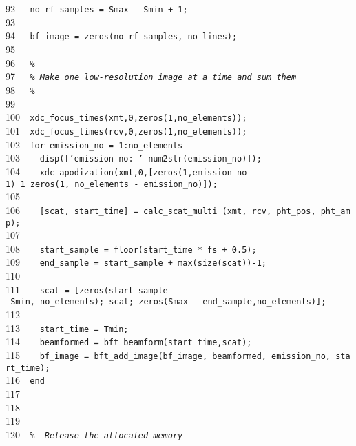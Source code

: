 \documentclass{manual}
\begin{document}
{92{\tt~~~}{\tt no\_rf\_samples~=~Smax~-~Smin~+~1;}\\
93{\tt~~~}{\tt }\\
94{\tt~~~}{\tt bf\_image~=~zeros(no\_rf\_samples,~no\_lines);}\\
95{\tt~~~}{\tt }\\
96{\tt~~~}{\tt {\sl \%}}\\
97{\tt~~~}{\tt {\sl \%~Make~one~low-resolution~image~at~a~time~and~sum~them}}\\
98{\tt~~~}{\tt {\sl \%}}\\
99{\tt~~~}{\tt }\\
100{\tt~~}{\tt xdc\_focus\_times(xmt,0,zeros(1,no\_elements));~}\\
101{\tt~~}{\tt xdc\_focus\_times(rcv,0,zeros(1,no\_elements));}\\
102{\tt~~}{\tt for~emission\_no~=~1:no\_elements}\\
103{\tt~~}{\tt ~~disp(['emission~no:~'~num2str(emission\_no)]);~~}\\
104{\tt~~}{\tt ~~xdc\_apodization(xmt,0,[zeros(1,emission\_no-1)~1~zeros(1,~no\_elements~-~emission\_no)]);}\\
105{\tt~~}{\tt }\\
106{\tt~~}{\tt ~~[scat,~start\_time]~=~calc\_scat\_multi~(xmt,~rcv,~pht\_pos,~pht\_amp);}\\
107{\tt~~}{\tt }\\
108{\tt~~}{\tt ~~start\_sample~=~floor(start\_time~*~fs~+~0.5);}\\
109{\tt~~}{\tt ~~end\_sample~=~start\_sample~+~max(size(scat))-1;}\\
110{\tt~~}{\tt ~~}\\
111{\tt~~}{\tt ~~scat~=~[zeros(start\_sample~-~Smin,~no\_elements);~scat;~zeros(Smax~-~end\_sample,no\_elements)];}\\
112{\tt~~}{\tt ~}\\
113{\tt~~}{\tt ~~start\_time~=~Tmin;}\\
114{\tt~~}{\tt ~~beamformed~=~bft\_beamform(start\_time,scat);}\\
115{\tt~~}{\tt ~~bf\_image~=~bft\_add\_image(bf\_image,~beamformed,~emission\_no,~start\_time);}\\
116{\tt~~}{\tt end}\\
117{\tt~~}{\tt }\\
118{\tt~~}{\tt }\\
119{\tt~~}{\tt }\\
120{\tt~~}{\tt {\sl \%~~Release~the~allocated~memory}}\\
}
\end{document}

